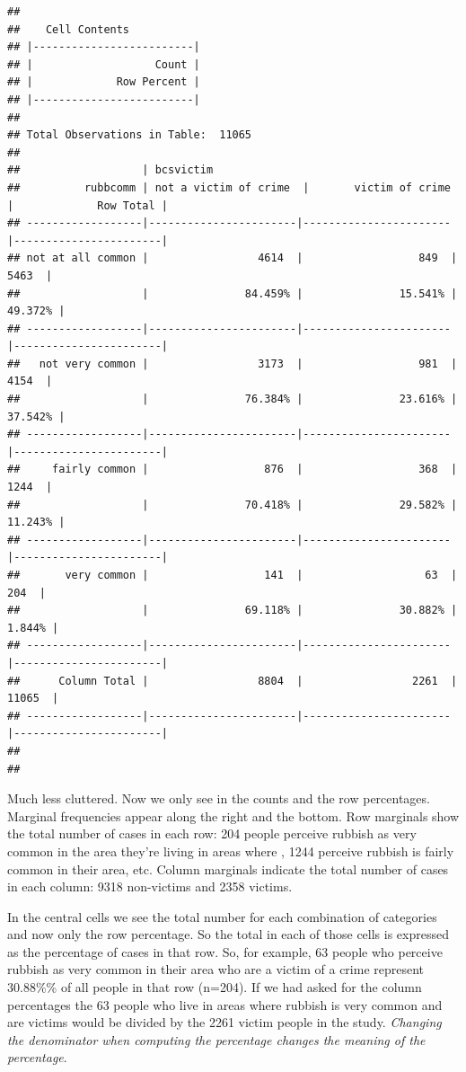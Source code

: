 \documentclass[]{book}
\theoremstyle{definition}
\theoremstyle{definition}
\theoremstyle{definition}
\theoremstyle{remark}
\begin{document}
\begin{verbatim}
## 
##    Cell Contents
## |-------------------------|
## |                   Count |
## |             Row Percent |
## |-------------------------|
## 
## Total Observations in Table:  11065 
## 
##                   | bcsvictim 
##          rubbcomm | not a victim of crime  |       victim of crime  |             Row Total | 
## ------------------|-----------------------|-----------------------|-----------------------|
## not at all common |                 4614  |                  849  |                 5463  | 
##                   |               84.459% |               15.541% |               49.372% | 
## ------------------|-----------------------|-----------------------|-----------------------|
##   not very common |                 3173  |                  981  |                 4154  | 
##                   |               76.384% |               23.616% |               37.542% | 
## ------------------|-----------------------|-----------------------|-----------------------|
##     fairly common |                  876  |                  368  |                 1244  | 
##                   |               70.418% |               29.582% |               11.243% | 
## ------------------|-----------------------|-----------------------|-----------------------|
##       very common |                  141  |                   63  |                  204  | 
##                   |               69.118% |               30.882% |                1.844% | 
## ------------------|-----------------------|-----------------------|-----------------------|
##      Column Total |                 8804  |                 2261  |                11065  | 
## ------------------|-----------------------|-----------------------|-----------------------|
## 
## 
\end{verbatim}

Much less cluttered. Now we only see in the counts and the row
percentages. Marginal frequencies appear along the right and the bottom.
Row marginals show the total number of cases in each row: 204 people
perceive rubbish as very common in the area they're living in areas
where , 1244 perceive rubbish is fairly common in their area, etc.
Column marginals indicate the total number of cases in each column: 9318
non-victims and 2358 victims.

In the central cells we see the total number for each combination of
categories and now only the row percentage. So the total in each of
those cells is expressed as the percentage of cases in that row. So, for
example, 63 people who perceive rubbish as very common in their area who
are a victim of a crime represent 30.88\%\% of all people in that row
(n=204). If we had asked for the column percentages the 63 people who
live in areas where rubbish is very common and are victims would be
divided by the 2261 victim people in the study. \emph{Changing the
denominator when computing the percentage changes the meaning of the
percentage}.
\end{document}
